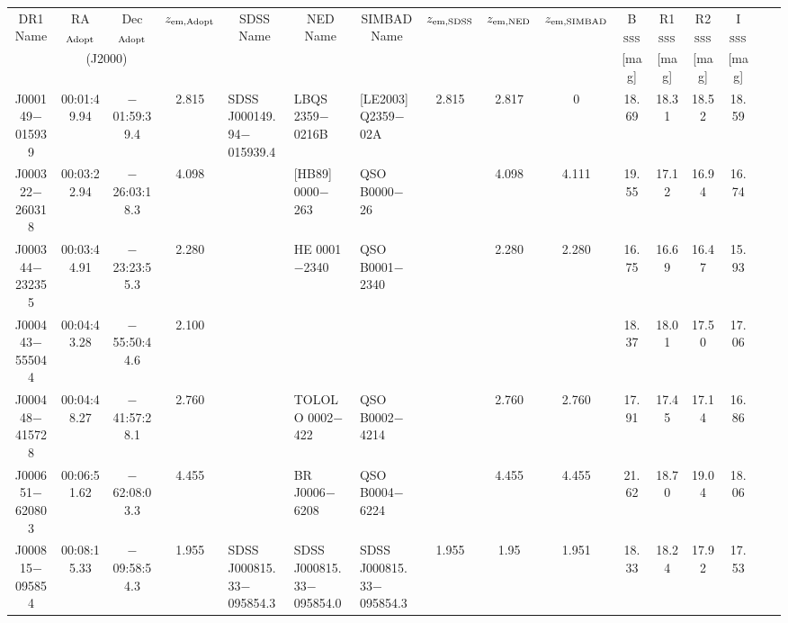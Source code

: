 {\footnotesize
\begin{tabular}{cccclllccccccccc}
\hline
  \multicolumn{1}{c}{DR1 Name} &
  \multicolumn{1}{c}{RA$_{\rm Adopt}$} &
  \multicolumn{1}{c}{Dec$_{\rm Adopt}$} &
  \multicolumn{1}{c}{$z_{\rm em,Adopt}$} &
  \multicolumn{1}{c}{SDSS Name} &
  \multicolumn{1}{c}{NED Name} &
  \multicolumn{1}{c}{SIMBAD Name} &
  \multicolumn{1}{c}{$z_{\rm em,SDSS}$} &
  \multicolumn{1}{c}{$z_{\rm em,NED}$} &
  \multicolumn{1}{c}{$z_{\rm em,SIMBAD}$} &
  \multicolumn{1}{c}{B$_{\rm SSS}$} &
  \multicolumn{1}{c}{R1$_{\rm SSS}$} &
  \multicolumn{1}{c}{R2$_{\rm SSS}$} &
  \multicolumn{1}{c}{I$_{\rm SSS}$} \\
  &
  \multicolumn{2}{c}{(J2000)} &
  &
  &
  &
  &
  &
  &
  &
  \multicolumn{1}{c}{[mag]} &
  \multicolumn{1}{c}{[mag]} &
  \multicolumn{1}{c}{[mag]} &
  \multicolumn{1}{c}{[mag]} \\
\hline
  J000149$-$015939 & 00:01:49.94 & $-$01:59:39.4 & 2.815 & SDSS J000149.94$-$015939.4 & LBQS 2359$-$0216B          & [LE2003] Q2359$-$02A       & 2.815 & 2.817 & 0     & 18.69 & 18.31 & 18.52 & 18.59 \\
  J000322$-$260318 & 00:03:22.94 & $-$26:03:18.3 & 4.098 &                            & [HB89] 0000$-$263          & QSO B0000$-$26             &       & 4.098 & 4.111 & 19.55 & 17.12 & 16.94 & 16.74 \\
  J000344$-$232355 & 00:03:44.91 & $-$23:23:55.3 & 2.280 &                            & HE 0001$-$2340             & QSO B0001$-$2340           &       & 2.280 & 2.280 & 16.75 & 16.69 & 16.47 & 15.93 \\
  J000443$-$555044 & 00:04:43.28 & $-$55:50:44.6 & 2.100 &                            &                            &                            &       &       &       & 18.37 & 18.01 & 17.50 & 17.06 \\
  J000448$-$415728 & 00:04:48.27 & $-$41:57:28.1 & 2.760 &                            & TOLOLO 0002$-$422          & QSO B0002$-$4214           &       & 2.760 & 2.760 & 17.91 & 17.45 & 17.14 & 16.86 \\
  J000651$-$620803 & 00:06:51.62 & $-$62:08:03.3 & 4.455 &                            & BR J0006$-$6208            & QSO B0004$-$6224           &       & 4.455 & 4.455 & 21.62 & 18.70 & 19.04 & 18.06 \\
  J000815$-$095854 & 00:08:15.33 & $-$09:58:54.3 & 1.955 & SDSS J000815.33$-$095854.3 & SDSS J000815.33$-$095854.0 & SDSS J000815.33$-$095854.3 & 1.955 & 1.95  & 1.951 & 18.33 & 18.24 & 17.92 & 17.53 \\

\end{tabular}}
